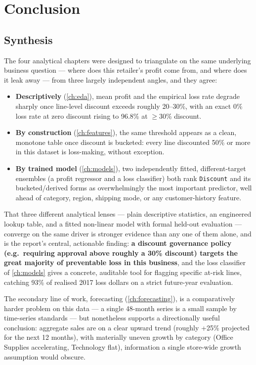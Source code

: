 \chapter{Conclusion}
\label{ch:conclusion}

\section{Synthesis}
The four analytical chapters were designed to triangulate on the same
underlying business question — where does this retailer's profit come
from, and where does it leak away — from three largely independent
angles, and they agree:

\begin{itemize}
  \item \textbf{Descriptively} (\cref{ch:eda}), mean profit and the
        empirical loss rate degrade sharply once line-level discount
        exceeds roughly 20--30\%, with an exact 0\% loss rate at zero
        discount rising to 96.8\% at $\geq$30\% discount.
  \item \textbf{By construction} (\cref{ch:features}), the same threshold
        appears as a clean, monotone table once discount is bucketed:
        every line discounted 50\% or more in this dataset is
        loss-making, without exception.
  \item \textbf{By trained model} (\cref{ch:models}), two independently
        fitted, different-target ensembles (a profit regressor and a
        loss classifier) both rank \texttt{Discount} and its
        bucketed/derived forms as overwhelmingly the most important
        predictor, well ahead of category, region, shipping mode, or
        any customer-history feature.
\end{itemize}
That three different analytical lenses — plain descriptive statistics,
an engineered lookup table, and a fitted non-linear model with formal
held-out evaluation — converge on the same driver is stronger evidence
than any one of them alone, and is the report's central, actionable
finding: \textbf{a discount governance policy (e.g.\ requiring approval
above roughly a 30\% discount) targets the great majority of preventable
loss in this business}, and the loss classifier of \cref{ch:models}
gives a concrete, auditable tool for flagging specific at-risk lines,
catching 93\% of realised 2017 loss dollars on a strict future-year
evaluation.

The secondary line of work, forecasting (\cref{ch:forecasting}),
is a comparatively harder problem on this data — a single 48-month
series is a small sample by time-series standards — but nonetheless
supports a directionally useful conclusion: aggregate sales are on a
clear upward trend (roughly +25\% projected for the next 12 months), with
materially uneven growth by category (Office Supplies accelerating,
Technology flat), information a single store-wide growth assumption
would obscure.

